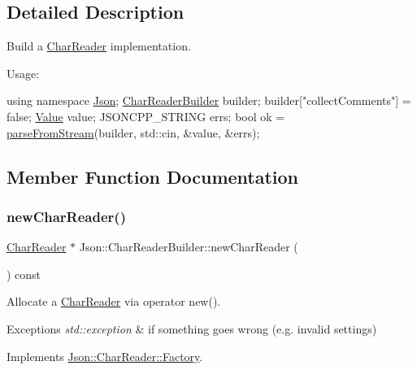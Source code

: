 \subsection{Detailed Description}
Build a \hyperlink{classJson_1_1CharReader}{Char\+Reader} implementation. 

Usage\+: 
\begin{DoxyCode}
\textcolor{keyword}{using namespace }\hyperlink{namespaceJson}{Json};
\hyperlink{classJson_1_1CharReaderBuilder}{CharReaderBuilder} builder;
builder[\textcolor{stringliteral}{"collectComments"}] = \textcolor{keyword}{false};
\hyperlink{classJson_1_1Value}{Value} value;
JSONCPP\_STRING errs;
\textcolor{keywordtype}{bool} ok = \hyperlink{namespaceJson_aab0cf1ecf81d1aeca12be2a416a84352}{parseFromStream}(builder, std::cin, &value, &errs);
\end{DoxyCode}
 

\subsection{Member Function Documentation}
\mbox{\label{classJson_1_1CharReaderBuilder_a3a262fcc76c1eb8eebfd4718fb4e9722}} 
\subsubsection{\texorpdfstring{new\+Char\+Reader()}{newCharReader()}}
{\footnotesize\ttfamily \hyperlink{classJson_1_1CharReader}{Char\+Reader} $\ast$ Json\+::\+Char\+Reader\+Builder\+::new\+Char\+Reader (\begin{DoxyParamCaption}{ }\end{DoxyParamCaption}) const\hspace{0.3cm}{\ttfamily [virtual]}}



Allocate a \hyperlink{classJson_1_1CharReader}{Char\+Reader} via operator new(). 


\begin{DoxyExceptions}{Exceptions}
{\em std\+::exception} & if something goes wrong (e.\+g. invalid settings) \\
\hline
\end{DoxyExceptions}


Implements \hyperlink{classJson_1_1CharReader_1_1Factory_a4c5862a1ffd432372dbe65cf59de98c4}{Json\+::\+Char\+Reader\+::\+Factory}.


